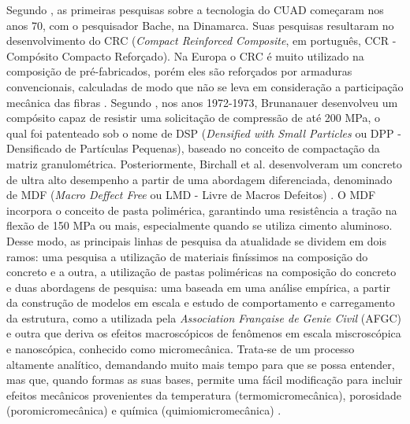

Segundo , as primeiras pesquisas sobre a tecnologia do CUAD começaram nos anos 70, com o pesquisador Bache, na Dinamarca. Suas pesquisas resultaram no desenvolvimento do CRC (\textit{Compact Reinforced Composite}, em português, CCR - Compósito Compacto Reforçado). Na Europa o CRC é muito utilizado na composição de pré-fabricados, porém eles são reforçados por armaduras convencionais, calculadas de modo que não se leva em consideração a participação mecânica das fibras \cite[p.~6]{Resplendino}. Segundo , nos anos 1972-1973, Brunanauer desenvolveu um compósito capaz de resistir uma solicitação de compressão de até 200 MPa, o qual foi patenteado sob o nome de DSP (\textit{Densified with Small Particles} ou DPP - Densificado de Partículas Pequenas), baseado no conceito de compactação da matriz granulométrica. Posteriormente, Birchall et al. desenvolveram um concreto de ultra alto desempenho a partir de uma abordagem diferenciada, denominado de MDF (\textit{Macro Deffect Free} ou LMD - Livre de Macros Defeitos) \cite{Aitcin}. O MDF incorpora o conceito de pasta polimérica, garantindo uma resistência a tração na flexão de 150 MPa ou mais, especialmente quando se utiliza cimento aluminoso. Desse modo, as principais linhas de pesquisa da atualidade se dividem em dois ramos: uma pesquisa a utilização de materiais finíssimos na composição do concreto e a outra, a utilização de pastas poliméricas na composição do concreto \cite[p.~8]{Vanderlei} e duas abordagens de pesquisa: uma baseada em uma análise empírica, a partir da construção de modelos em escala e estudo de comportamento e carregamento da estrutura, como a utilizada pela \textit{Association Française de Genie Civil} (AFGC) e outra que deriva os efeitos macroscópicos de fenômenos em escala miscroscópica e nanoscópica, conhecido como micromecânica. Trata-se de um processo altamente analítico, demandando muito mais tempo para que se possa entender, mas que, quando formas as suas bases, permite uma fácil modificação para incluir efeitos mecânicos provenientes da temperatura (termomicromecânica), porosidade (poromicromecânica) e química (quimiomicromecânica) \cite{Davila}. 


